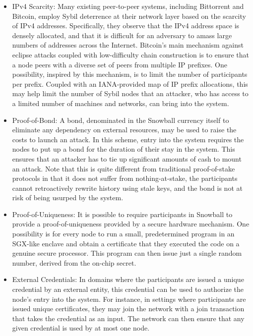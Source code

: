 \begin{itemize}
\item IPv4 Scarcity: Many existing peer-to-peer systems, including Bittorrent and Bitcoin, employ Sybil deterrence at their network layer based on the scarcity of IPv4 addresses. 
Specifically, they observe that the IPv4 address space is densely allocated, and that it is difficult for an adversary to amass large numbers of addresses across the Internet.
Bitcoin's main mechanism against eclipse attacks coupled with low-difficulty chain construction is to ensure that a node peers with a diverse set of peers from multiple IP prefixes. 
One possibility, inspired by this mechanism, is to limit the number of participants per prefix. 
Coupled with an IANA-provided map of IP prefix allocations, this may help limit the number of Sybil nodes that an attacker, who has access to a limited number of machines and networks, can bring into the system.
\item Proof-of-Bond: A bond, denominated in the Snowball currency itself to eliminate any dependency on external resources, may be used to raise the costs to launch an attack. 
In this scheme, entry into the system requires the nodes to put up a bond for the duration of their stay in the system. 
This ensures that an attacker has to tie up significant amounts of cash to mount an attack.
Note that this is quite different from traditional proof-of-stake protocols in that it does not suffer from nothing-at-stake, the participants cannot retroactively rewrite history using stale keys, and the bond is not at risk of being usurped by the system.
\item Proof-of-Uniqueness: It is possible to require participants in Snowball to provide a proof-of-uniqueness provided by a secure hardware mechanism. 
One possibility is for every node to run a small, predetermined program in an SGX-like enclave and obtain a certificate that they executed the code on a genuine secure processor. 
This program can then issue just a single random number, derived from the on-chip secret.
\item External Credentials: In domains where the participants are issued a unique credential by an external entity, this credential can be used to authorize the node's entry into the system.
For instance, in settings where participants are issued unique certificates, they may join the network with a join transaction that takes the credential as an input. 
The network can then ensure that any given credential is used by at most one node.

\end{itemize}

